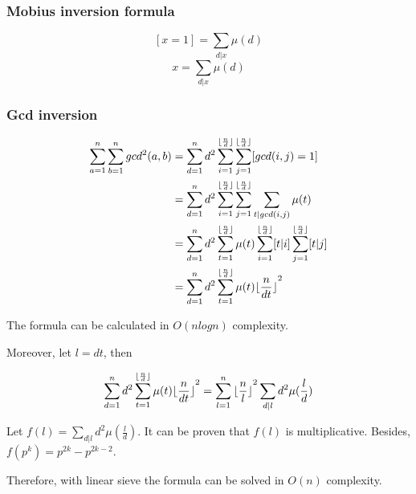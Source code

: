 \subsubsection{Mobius inversion formula}

$$[x = 1] = \sum_{d|x}\mu(d)$$
$$x = \sum_{d|x}\mu(d)$$

\subsubsection{Gcd inversion}
\begin{equation*}
\begin{split}
\sum_{a=1}^n\sum_{b=1}^ngcd^2(a,b)&=\sum_{d=1}^nd^2\sum_{i=1}^{\lfloor\frac{n}{d}\rfloor}\sum_{j=1}^{\lfloor\frac{n}{d}\rfloor}[gcd(i,j)=1]\\
&=\sum_{d=1}^nd^2\sum_{i=1}^{\lfloor\frac{n}{d}\rfloor}\sum_{j=1}^{\lfloor\frac{n}{d}\rfloor}\sum_{t|gcd(i,j)}\mu(t)\\
&=\sum_{d=1}^nd^2\sum_{t=1}^{\lfloor\frac{n}{d}\rfloor}\mu(t)\sum_{i=1}^{\lfloor\frac{n}{d}\rfloor}[t|i]\sum_{j=1}^{\lfloor\frac{n}{d}\rfloor}[t|j]\\
&=\sum_{d=1}^nd^2\sum_{t=1}^{\lfloor\frac{n}{d}\rfloor}\mu(t){\lfloor\frac{n}{dt}\rfloor}^2\\
\end{split}
\end{equation*}

The formula can be calculated in $O(nlogn)$ complexity.

Moreover, let $l=dt$, then

\begin{equation*}
\begin{split}
\sum_{d=1}^nd^2\sum_{t=1}^{\lfloor\frac{n}{d}\rfloor}\mu(t){\lfloor\frac{n}{dt}\rfloor}^2&=\sum_{l=1}^n{\lfloor\frac{n}{l}\rfloor}^2\sum_{d|l}d^2\mu(\frac{l}{d})\\
\end{split}
\end{equation*}

Let $f(l)=\sum_{d|l}d^2\mu(\frac{l}{d})$. It can be proven that $f(l)$ is multiplicative. Besides, $f(p^k)=p^{2k}-p^{2k-2}$.

Therefore, with linear sieve the formula can be solved in $O(n)$ complexity.

